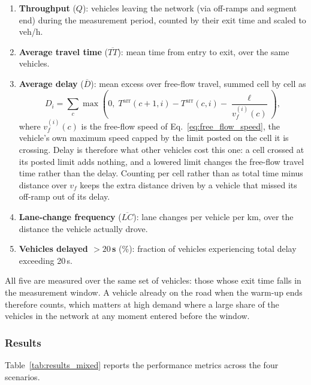 \documentclass[review,authoryear]{elsarticle}
\newcommand{\Tarr}{T^{\text{arr}}}
\begin{document}
\begin{enumerate}
    \item \textbf{Throughput} ($Q$): vehicles leaving the network (via off-ramps and segment end) during the measurement period, counted by their exit time and scaled to veh/h.
    \item \textbf{Average travel time} ($\overline{TT}$): mean time from entry to exit, over the same vehicles.
    \item \textbf{Average delay} ($\overline{D}$): mean excess over free-flow travel, summed cell by cell as
    \begin{equation}
        D_i = \sum_{c} \max\!\left(0,\; \Tarr(c+1,i) - \Tarr(c,i) - \frac{\ell}{v_f^{(i)}(c)}\right),
        \label{eq:delay}
    \end{equation}
    where $v_f^{(i)}(c)$ is the free-flow speed of Eq.~\ref{eq:free_flow_speed}, the vehicle's own maximum speed capped by the limit posted on the cell it is crossing. Delay is therefore what other vehicles cost this one: a cell crossed at its posted limit adds nothing, and a lowered limit changes the free-flow travel time rather than the delay. Counting per cell rather than as total time minus distance over $v_f$ keeps the extra distance driven by a vehicle that missed its off-ramp out of its delay.
    \item \textbf{Lane-change frequency} ($\overline{LC}$): lane changes per vehicle per km, over the distance the vehicle actually drove.
    \item \textbf{Vehicles delayed $> 20$\,s} (\%): fraction of vehicles experiencing total delay exceeding 20\,s.
\end{enumerate}

All five are measured over the same set of vehicles: those whose exit time falls in the measurement window. A vehicle already on the road when the warm-up ends therefore counts, which matters at high demand where a large share of the vehicles in the network at any moment entered before the window.

\subsubsection{Results}

Table~\ref{tab:results_mixed} reports the performance metrics across the four scenarios.
\end{document}
